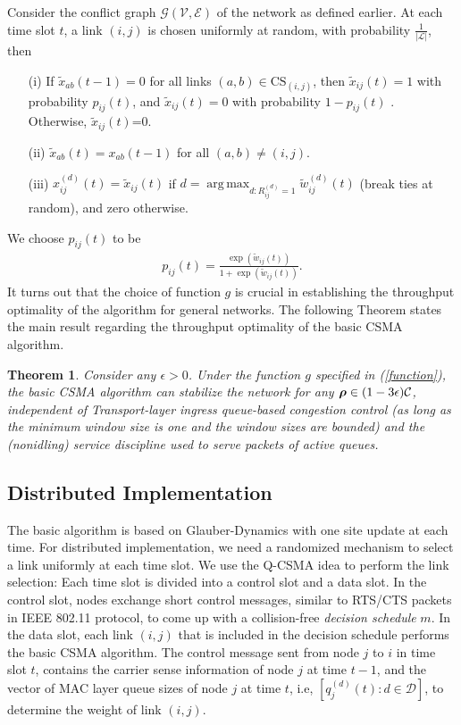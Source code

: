 \documentclass[10pt,onecolumn,draftclsnofoot,journal]{IEEEtran}
\newtheorem{theorem}{Theorem}
\DeclareMathOperator*{\argmax}{arg\,max}
\newcommand{\brho}{\mbox{\boldmath$\rho$}}
\newcommand{\mD} {\mathcal{D}}
\newcommand{\be}{\begin{eqnarray}}
\newcommand{\ee}{\end{eqnarray}}
\newcommand{\cG}{\mathcal{G}}
\newcommand{\cV}{\mathcal{V}}
\newcommand{\cE}{\mathcal{E}}
\begin{document}
Consider the conflict graph $\cG(\cV,\cE)$ of the network as defined earlier. At each time slot $t$, a link $(i,j)$ is chosen uniformly at random, with probability $\frac{1}{|\mathcal{L}|}$, then
\begin{itemize}
\item [(i)] If $\tilde{x}_{ab}(t-1)=0$ for all links $(a,b) \in \mathrm{CS}_{(i,j)}$, then
$\tilde{x}_{ij}(t)=1$ with probability $p_{ij}(t)$, and $\tilde{x}_{ij}(t)=0$ with probability $1-p_{ij}(t)$ .\\
Otherwise, $\tilde{x}_{ij}(t)$=0.
\item[(ii)] $\tilde{x}_{ab}(t)=x_{ab}(t-1)$ for all $(a,b) \neq (i,j)$.
\item [(iii)] $x^{(d)}_{ij}(t)=\tilde{x}_{ij}(t)$ if $d=\argmax_{d:R_{ij}^{(d)}=1} \tilde{w}^{(d)}_{ij}(t)$ (break ties at random), and zero otherwise.
\end{itemize}
We choose $p_{ij}(t)$ to be
\be
p_{ij}(t)=\frac{\exp(\widetilde{w}_{ij}(t))}{1+\exp(\widetilde{w}_{ij}(t))}.
\ee
It turns out that the choice of function $g$ is crucial in establishing the throughput optimality of the algorithm for general networks. The following Theorem states the main result regarding the throughput optimality of the basic CSMA algorithm.
\begin{theorem}\label{th1}
Consider any $\epsilon > 0$. Under the function $g$ specified in (\ref{function}), the basic CSMA algorithm can stabilize the network for any $\brho \in (1-3\epsilon)\mathcal{C}$, independent of Transport-layer ingress queue-based congestion control (as long as the minimum window
size is one and the window sizes are bounded) and the (nonidling)
service discipline used to serve packets of active
queues.
\end{theorem}
\subsection{Distributed Implementation}
The basic algorithm is based on Glauber-Dynamics with one site update at each time. For distributed implementation, we need a randomized mechanism to select a link uniformly at each time slot. We use the Q-CSMA idea \cite{srikant2} to perform the link selection: Each time slot is divided into a control slot and a data slot. In the control slot, nodes exchange short control messages, similar to RTS/CTS packets in IEEE 802.11 protocol, to come up with a collision-free \textit{decision schedule} $m$. In the data slot, each link $(i,j)$ that is included in the decision schedule performs the basic CSMA algorithm.
The control message sent from node $j$ to $i$ in time slot $t$, contains the carrier sense information of node $j$ at time $t-1$, and the vector of MAC layer queue sizes of node $j$ at time $t$, i.e, $[q^{(d)}_j(t): d \in \mD]$, to determine the weight of link $(i,j)$.
\end{document}
